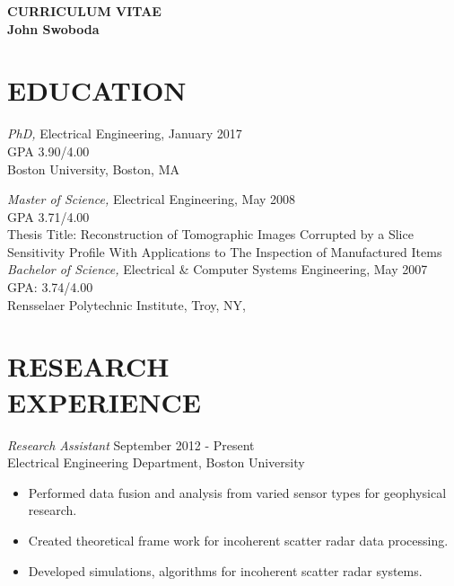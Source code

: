 
\thispagestyle{empty}

\begin{center}
{\LARGE {\bf CURRICULUM VITAE}}\\
\vspace{0.5in}
{\large {\bf John Swoboda}}
\end{center}

\section*{EDUCATION}{\sl PhD,} Electrical Engineering, January 2017 \\
                GPA 3.90/4.00 \\
                Boston University, Boston, MA
	       

{\sl Master of Science,} Electrical Engineering, May 2008 \\
                 GPA 3.71/4.00\\
                Thesis Title: Reconstruction of Tomographic Images Corrupted by a Slice Sensitivity Profile With Applications to The Inspection of Manufactured Items\\
 {\sl Bachelor of Science,} Electrical \& Computer Systems Engineering, May 2007  \\
                GPA: 3.74/4.00\\
                Rensselaer Polytechnic Institute, Troy, NY, \\
                
 
 

 
\section*{RESEARCH \\ EXPERIENCE}
 {\sl Research Assistant} \hfill            September 2012 - Present \\
                Electrical Engineering Department, Boston University 
                 \begin{itemize}  \itemsep -2pt %
                 \item Performed data fusion and analysis from varied sensor types for geophysical research.
                 \item Created theoretical frame work for incoherent scatter radar data processing.
                 \item Developed simulations, algorithms for incoherent scatter radar systems.
                 \end{itemize} 


